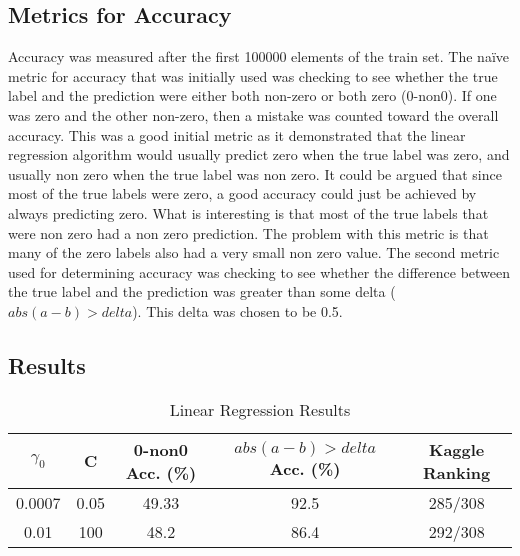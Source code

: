 \documentclass[pdftex,a4paper,11pt]{article}
\begin{document}
\subsection{Metrics for Accuracy}
Accuracy was measured after the first 100000 elements of the train set. The na{\"i}ve metric for accuracy that was initially used was checking to see whether the true label and the prediction were either both non-zero or both zero (0-non0). If one was zero and the other non-zero, then a mistake was counted toward the overall accuracy. This was a good initial metric as it demonstrated that the linear regression algorithm would usually predict zero when the true label was zero, and usually non zero when the true label was non zero. It could be argued that since most of the true labels were zero, a good accuracy could just be achieved by always predicting zero. What is interesting is that most of the true labels that were non zero had a non zero prediction. The problem with this metric is that many of the zero labels also had a very small non zero value. The second metric used for determining accuracy was checking to see whether the difference between the true label and the prediction was greater than some delta ($abs(a - b) > delta$). This delta was chosen to be 0.5.
\subsection{Results}
  \begin{table}[h]
        {\centering
          \begin{tabular}{|c|c|c|c|c|}
            \hline
             $\gamma_0$ & C & 0-non0 Acc. (\%) & $abs(a - b) > delta$ Acc. (\%) & Kaggle Ranking\\
            \hline
                0.0007 &   0.05        &  49.33  & 92.5 & 285/308  \\
             \hline
                0.01 &  100         &  48.2 & 86.4 & 292/308 \\
             \hline
          \end{tabular}
          \caption{Linear Regression Results}          
          \label{table:linAcc}}
  \end{table}
\end{document}
